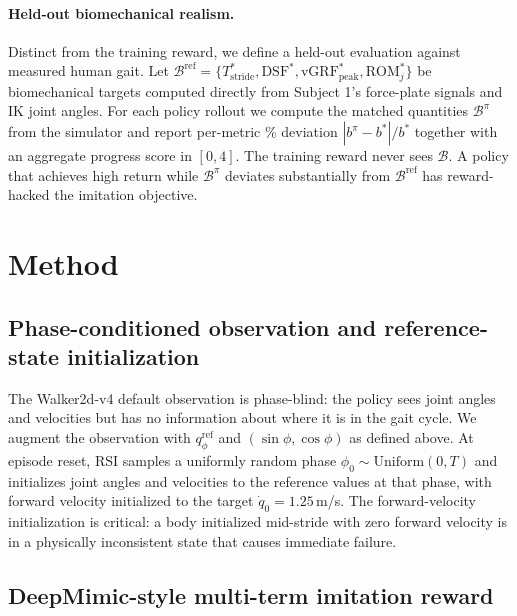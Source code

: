 \documentclass{article}
\begin{document}
\paragraph{Held-out biomechanical realism.} Distinct from the training reward, we define a held-out evaluation against measured human gait. Let $\mathcal{B}^{\text{ref}} = \{T_{\text{stride}}^*, \mathrm{DSF}^*, \mathrm{vGRF}^*_{\text{peak}}, \mathrm{ROM}^*_j\}$ be biomechanical targets computed directly from Subject 1's force-plate signals and IK joint angles. For each policy rollout we compute the matched quantities $\mathcal{B}^{\pi}$ from the simulator and report per-metric \% deviation $|b^\pi - b^*| / b^*$ together with an aggregate progress score in $[0, 4]$. The training reward never sees $\mathcal{B}$. A policy that achieves high return while $\mathcal{B}^\pi$ deviates substantially from $\mathcal{B}^{\text{ref}}$ has reward-hacked the imitation objective.

\section{Method}
\label{sec:method}

\subsection{Phase-conditioned observation and reference-state initialization}

The Walker2d-v4 default observation is phase-blind: the policy sees joint angles and velocities but has no information about where it is in the gait cycle. We augment the observation with $q^{\text{ref}}_\phi$ and $(\sin\phi, \cos\phi)$ as defined above. At episode reset, RSI samples a uniformly random phase $\phi_0 \sim \mathrm{Uniform}(0, T)$ and initializes joint angles and velocities to the reference values at that phase, with forward velocity initialized to the target $\dot q_0 = 1.25$\,m/s. The forward-velocity initialization is critical: a body initialized mid-stride with zero forward velocity is in a physically inconsistent state that causes immediate failure.

\subsection{DeepMimic-style multi-term imitation reward}
\end{document}
